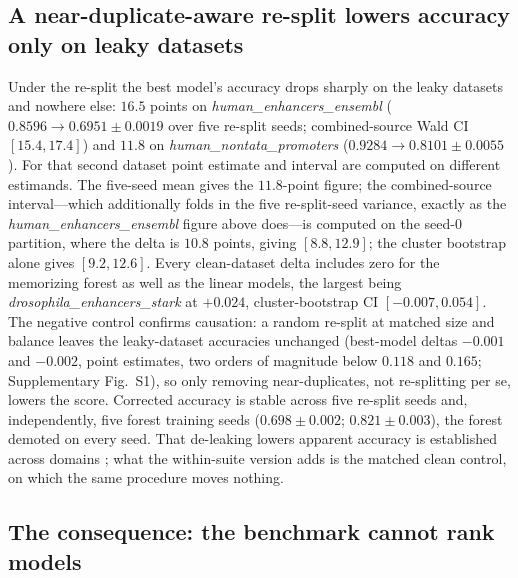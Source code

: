 \documentclass[webpdf,modern,large,namedate]{oup-authoring-template}%
\begin{document}
\subsection{A near-duplicate-aware re-split lowers accuracy only on leaky datasets}\label{sec:r-drop}
Under the re-split the best model's accuracy drops sharply on the leaky datasets and nowhere else: $16.5$ points on \textit{human\_enhancers\_ensembl} ($0.8596\to0.6951\pm0.0019$ over five re-split seeds; combined-source Wald CI $[15.4,17.4]$) and $11.8$ on \textit{human\_nontata\_promoters} ($0.9284\to0.8101\pm0.0055$). For that second dataset point estimate and interval are computed on different estimands. The five-seed mean gives the $11.8$-point figure; the combined-source interval---which additionally folds in the five re-split-seed variance, exactly as the \textit{human\_enhancers\_ensembl} figure above does---is computed on the seed-$0$ partition, where the delta is $10.8$ points, giving $[8.8,12.9]$; the cluster bootstrap alone gives $[9.2,12.6]$. Every clean-dataset delta includes zero for the memorizing forest as well as the linear models, the largest being \textit{drosophila\_enhancers\_stark} at $+0.024$, cluster-bootstrap CI $[-0.007,0.054]$. The negative control confirms causation: a random re-split at matched size and balance leaves the leaky-dataset accuracies unchanged (best-model deltas $-0.001$ and $-0.002$, point estimates, two orders of magnitude below $0.118$ and $0.165$; Supplementary Fig.~S1), so only removing near-duplicates, not re-splitting per se, lowers the score. Corrected accuracy is stable across five re-split seeds and, independently, five forest training seeds ($0.698\pm0.002$; $0.821\pm0.003$), the forest demoted on every seed. That de-leaking lowers apparent accuracy is established across domains \citep{kapoor2023leakage,rafi2026,bushuiev2024}; what the within-suite version adds is the matched clean control, on which the same procedure moves nothing.

\subsection{The consequence: the benchmark cannot rank models}\label{sec:r-rank}
\end{document}
